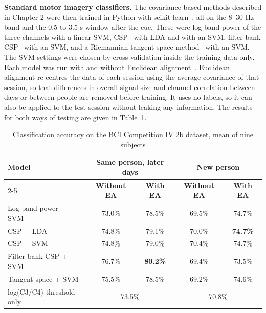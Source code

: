 \textbf{Standard motor imagery classifiers.} The covariance-based methods described in
Chapter 2 were then trained in Python with scikit-learn~\cite{pedregosa2011sklearn}, all on
the 8--30 Hz band and the 0.5 to 3.5 s window after the cue. These were log band power of
the three channels with a linear SVM, CSP~\cite{ramoser2000csp} with LDA and with an SVM,
filter bank CSP~\cite{ang2012fbcsp} with an SVM, and a Riemannian tangent space
method~\cite{barachant2012riemann} with an SVM. The SVM settings were chosen by
cross-validation inside the training data only. Each model was run with and without
Euclidean alignment~\cite{he2020ea}. Euclidean alignment re-centres the data of each
session using the average covariance of that session, so that differences in overall
signal size and channel correlation between days or between people are removed before
training. It uses no labels, so it can also be applied to the test session without
leaking any information. The results for both ways of testing are given in
Table~\ref{tab:bci2b_models}.

\begin{table}[!htbp]
\centering
\caption{Classification accuracy on the BCI Competition IV 2b dataset, mean of nine subjects}
\label{tab:bci2b_models}
\begin{tabular}{|l|c|c|c|c|}
\hline
\multirow{2}{*}{\textbf{Model}} & \multicolumn{2}{c|}{\textbf{Same person, later days}} & \multicolumn{2}{c|}{\textbf{New person}} \\
\cline{2-5}
 & \textbf{Without EA} & \textbf{With EA} & \textbf{Without EA} & \textbf{With EA} \\
\hline
Log band power + SVM & 73.0\% & 78.5\% & 69.5\% & 74.7\% \\
\hline
CSP + LDA & 74.8\% & 79.1\% & 70.0\% & \textbf{74.7\%} \\
\hline
CSP + SVM & 74.8\% & 79.0\% & 70.4\% & 74.7\% \\
\hline
Filter bank CSP + SVM & 76.7\% & \textbf{80.2\%} & 69.4\% & 73.5\% \\
\hline
Tangent space + SVM & 75.5\% & 78.5\% & 69.2\% & 74.6\% \\
\hline
log(C3/C4) threshold only & \multicolumn{2}{c|}{73.5\%} & \multicolumn{2}{c|}{70.8\%} \\
\hline
\end{tabular}
\end{table}

